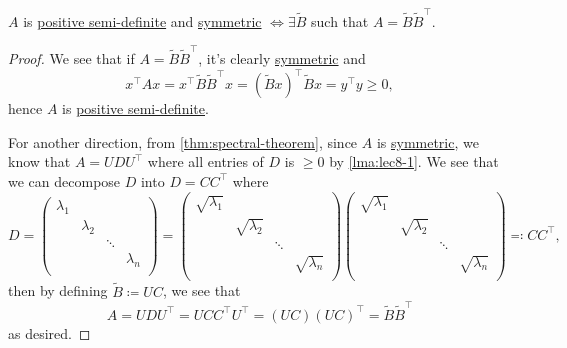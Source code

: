 \begin{lemma}\label{lma:lec8-2}
	\(A\) is \hyperref[def:positive-semi-definite]{positive semi-definite} and \hyperref[def:symmetric-matrix]{symmetric} \(\iff \exists \widetilde{B}\) such
	that \(A = \widetilde{B} \widetilde{B} ^{\top}\).
\end{lemma}
\begin{proof}
	We see that if \(A = \widetilde{B} \widetilde{B} ^{\top} \), it's clearly \hyperref[def:symmetric-matrix]{symmetric} and
	\[
		x^{\top} A x = x^{\top} \widetilde{B} \widetilde{B} ^{\top} x = (\widetilde{B} x)^{\top} \widetilde{B} x = y^{\top} y \geq 0,
	\]
	hence \(A\) is \hyperref[def:positive-semi-definite]{positive semi-definite}.

	For another direction, from \autoref{thm:spectral-theorem}, since \(A\) is \hyperref[def:symmetric-matrix]{symmetric}, we know that \(A = U D U^{\top}\) where
	all entries of \(D\) is \(\geq 0\) by \autoref{lma:lec8-1}. We see that we can decompose \(D\) into \(D = C C^{\top} \) where
	\[
		D = \begin{pmatrix}
			\lambda_1 &           &        &           \\
			          & \lambda_2 &        &           \\
			          &           & \ddots &           \\
			          &           &        & \lambda_n \\
		\end{pmatrix} = \begin{pmatrix}
			\sqrt{\lambda_1} &                  &        &                  \\
			                 & \sqrt{\lambda_2} &        &                  \\
			                 &                  & \ddots &                  \\
			                 &                  &        & \sqrt{\lambda_n} \\
		\end{pmatrix} \begin{pmatrix}
			\sqrt{\lambda_1} &                  &        &                  \\
			                 & \sqrt{\lambda_2} &        &                  \\
			                 &                  & \ddots &                  \\
			                 &                  &        & \sqrt{\lambda_n} \\
		\end{pmatrix} \eqqcolon C C^{\top},
	\]
	then by defining \(\widetilde{B} \coloneqq UC\), we see that
	\[
		A = U D U^{\top} = U C C^{\top} U^{\top} = (UC) (UC)^{\top} = \widetilde{B} \widetilde{B} ^{\top}
	\]
	as desired.
\end{proof}

